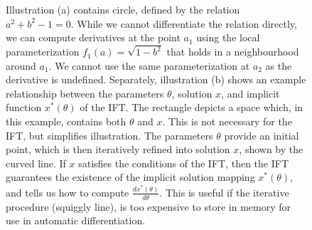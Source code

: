 \documentclass[11pt]{article}
\begin{document}
\begin{figure}
\centering
\begin{subfigure}[b]{0.45\textwidth}
\centering
{}
\caption{}
\end{subfigure}
\begin{subfigure}[b]{0.45\textwidth}
\centering
{}
\caption{}
\end{subfigure}
\caption{
\label{fig:circle}
Illustration (a) contains circle, defined by the relation $a^2 + b^2 - 1 = 0$.
While we cannot differentiate the relation directly,
we can compute derivatives at the point $a_1$ using the local parameterization $f_1(a)=\sqrt{1-b^2}$ that holds
in a neighbourhood around $a_1$.
We cannot use the same parameterization at $a_2$ as the derivative is undefined.
Separately, illustration (b) shows an example relationship between the parameters $\theta$,
solution $x$, and implicit function $x^*(\theta)$ of the IFT.
The rectangle depicts a space which, in this example,
contains both $\theta$ and $x$.
This is not necessary for the IFT, but simplifies illustration.
The parameters $\theta$ provide an initial point, which is then iteratively refined
into solution $x$, shown by the curved line.
If $x$ satisfies the conditions of the IFT, then the IFT guarantees the
existence of the implicit solution mapping $x^*(\theta)$,
and tells us how to compute $\frac{dx^*(\theta)}{d\theta}$.
This is useful if the iterative procedure (squiggly line), is too expensive
to store in memory for use in automatic differentiation.
}
\end{figure}
\end{document}
